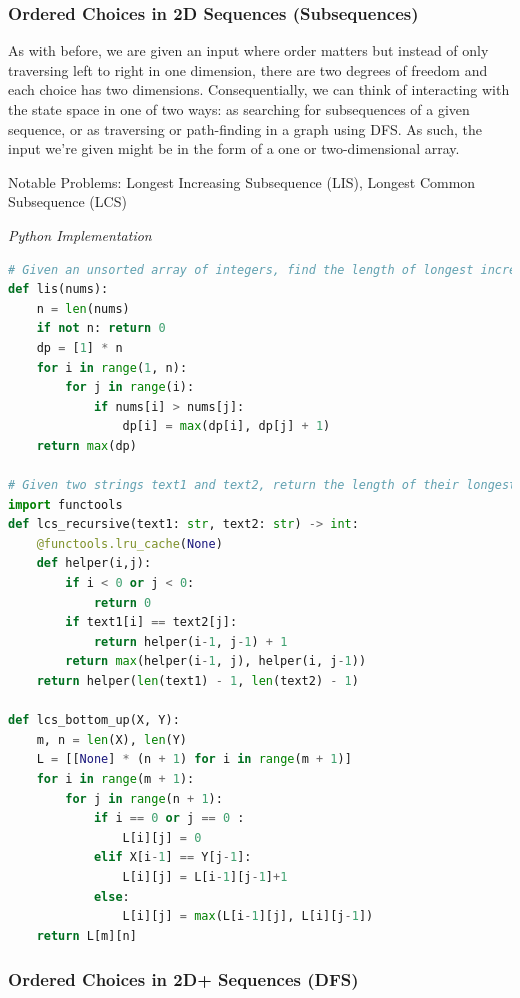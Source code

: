 \documentclass{article}
\newcommand{\comment}[1]{}
\begin{document}
\subsubsection*{Ordered Choices in 2D Sequences (Subsequences)}

\comment{
Search or Count Subsequences.

Optimize Sortable Compatible Subproblems
- Increased dimensions correspond to job scheduling problems
}
As with before, we are given an input where order matters but instead of only traversing left to right in one dimension, there are two degrees of freedom and each choice has two dimensions. Consequentially, we can think of interacting with the state space in one of two ways: as searching for subsequences of a given sequence, or as traversing or path-finding in a graph using DFS. As such, the input we're given might be in the form of a one or two-dimensional array.  

Notable Problems: Longest Increasing Subsequence (LIS), Longest Common Subsequence (LCS)

\vspace{8pt} \emph{Python Implementation}
\begin{lstlisting}[language=Python]
# Given an unsorted array of integers, find the length of longest increasing subsequence.
def lis(nums):
    n = len(nums)
    if not n: return 0
    dp = [1] * n
    for i in range(1, n):
        for j in range(i):
            if nums[i] > nums[j]:
                dp[i] = max(dp[i], dp[j] + 1)
    return max(dp)

# Given two strings text1 and text2, return the length of their longest common subsequence.
import functools
def lcs_recursive(text1: str, text2: str) -> int:
    @functools.lru_cache(None)
    def helper(i,j):
        if i < 0 or j < 0:
            return 0
        if text1[i] == text2[j]:
            return helper(i-1, j-1) + 1
        return max(helper(i-1, j), helper(i, j-1))
    return helper(len(text1) - 1, len(text2) - 1)

def lcs_bottom_up(X, Y): 
    m, n = len(X), len(Y)
    L = [[None] * (n + 1) for i in range(m + 1)] 
    for i in range(m + 1): 
        for j in range(n + 1): 
            if i == 0 or j == 0 : 
                L[i][j] = 0
            elif X[i-1] == Y[j-1]: 
                L[i][j] = L[i-1][j-1]+1
            else:
                L[i][j] = max(L[i-1][j], L[i][j-1]) 
    return L[m][n] 
\end{lstlisting}

\subsubsection*{Ordered Choices in 2D+ Sequences (DFS)}
\end{document}
